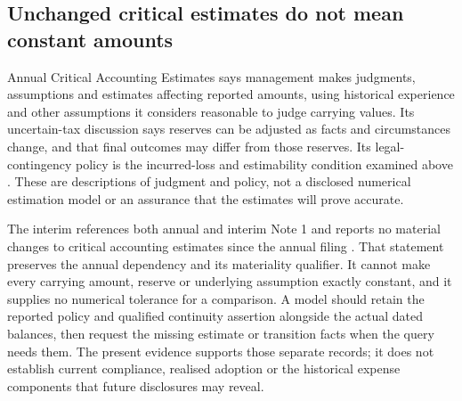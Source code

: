 \subsection{Unchanged critical estimates do not mean constant amounts}

Annual Critical Accounting Estimates says management makes judgments,
assumptions and estimates affecting reported amounts, using historical
experience and other assumptions it considers reasonable to judge carrying
values. Its uncertain-tax discussion says reserves can be adjusted as facts
and circumstances change, and that final outcomes may differ from those
reserves. Its legal-contingency policy is the incurred-loss and estimability
condition examined above \citep[Critical Accounting Estimates, printed p.~26]{apple2024}.
These are descriptions of judgment and policy, not a disclosed numerical
estimation model or an assurance that the estimates will prove accurate.

The interim references both annual and interim Note 1 and reports no material
changes to critical accounting estimates since the annual filing
\citep[Critical Accounting Estimates, printed p.~17]{apple2025q1}.
That statement preserves the annual dependency and its materiality qualifier.
It cannot make every carrying amount, reserve or underlying assumption exactly
constant, and it supplies no numerical tolerance for a comparison. A model
should retain the reported policy and qualified continuity assertion alongside
the actual dated balances, then request the missing estimate or transition
facts when the query needs them. The present evidence supports those separate
records; it does not establish current compliance, realised adoption or the
historical expense components that future disclosures may reveal.

